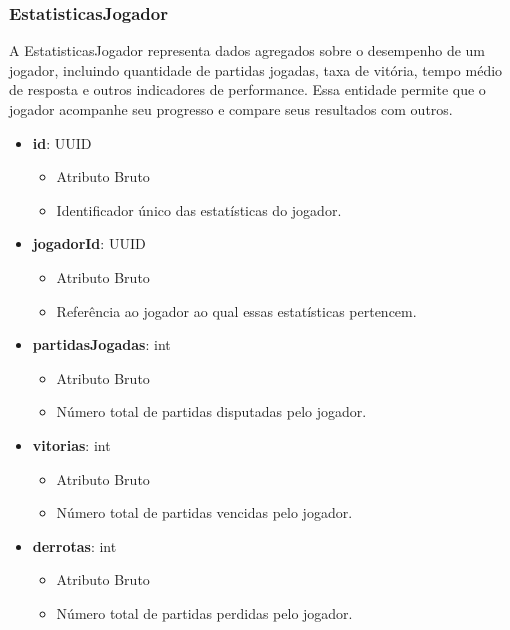     \subsubsection{EstatisticasJogador}
    A EstatisticasJogador representa dados agregados sobre o desempenho de um jogador, incluindo quantidade de partidas jogadas, taxa de vitória, tempo médio de resposta e outros indicadores de performance. Essa entidade permite que o jogador acompanhe seu progresso e compare seus resultados com outros.
    \begin{itemize}
        \item \textbf{id}: UUID  
              \begin{itemize}
                  \item Atributo Bruto
                  \item Identificador único das estatísticas do jogador.
              \end{itemize}
    
        \item \textbf{jogadorId}: UUID  
              \begin{itemize}
                  \item Atributo Bruto
                  \item Referência ao jogador ao qual essas estatísticas pertencem.
              \end{itemize}
    
        \item \textbf{partidasJogadas}: int  
              \begin{itemize}
                  \item Atributo Bruto
                  \item Número total de partidas disputadas pelo jogador.
              \end{itemize}
    
        \item \textbf{vitorias}: int  
              \begin{itemize}
                  \item Atributo Bruto
                  \item Número total de partidas vencidas pelo jogador.
              \end{itemize}
    
        \item \textbf{derrotas}: int  
              \begin{itemize}
                  \item Atributo Bruto
                  \item Número total de partidas perdidas pelo jogador.
              \end{itemize}
    

\end{itemize}
